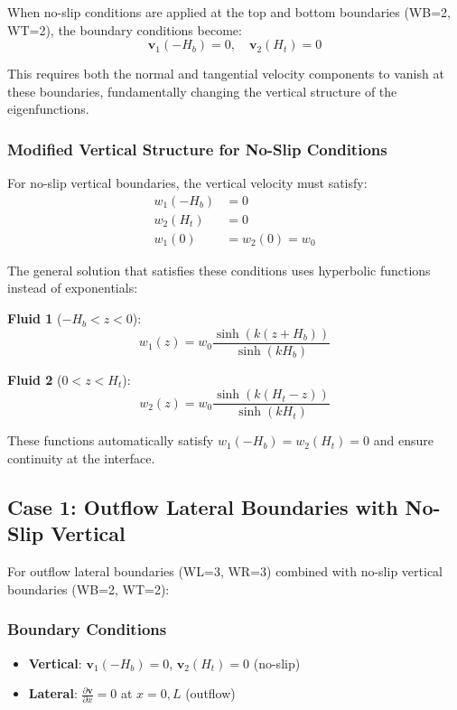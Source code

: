 \documentclass[12pt,a4paper]{article}
\begin{document}
When no-slip conditions are applied at the top and bottom boundaries (WB=2, WT=2), the boundary conditions become:
\begin{equation}
\mathbf{v}_1(-H_b) = 0, \quad \mathbf{v}_2(H_t) = 0
\end{equation}

This requires both the normal and tangential velocity components to vanish at these boundaries, fundamentally changing the vertical structure of the eigenfunctions.

\subsubsection{Modified Vertical Structure for No-Slip Conditions}

For no-slip vertical boundaries, the vertical velocity must satisfy:
\begin{align}
w_1(-H_b) &= 0 \\
w_2(H_t) &= 0 \\
w_1(0) &= w_2(0) = w_0
\end{align}

The general solution that satisfies these conditions uses hyperbolic functions instead of exponentials:

\textbf{Fluid 1} ($-H_b < z < 0$):
\begin{equation}
w_1(z) = w_0 \frac{\sinh(k(z + H_b))}{\sinh(kH_b)}
\end{equation}

\textbf{Fluid 2} ($0 < z < H_t$):
\begin{equation}
w_2(z) = w_0 \frac{\sinh(k(H_t - z))}{\sinh(kH_t)}
\end{equation}

These functions automatically satisfy $w_1(-H_b) = w_2(H_t) = 0$ and ensure continuity at the interface.

\subsection{Case 1: Outflow Lateral Boundaries with No-Slip Vertical}

For outflow lateral boundaries (WL=3, WR=3) combined with no-slip vertical boundaries (WB=2, WT=2):

\subsubsection{Boundary Conditions}
\begin{itemize}
    \item \textbf{Vertical}: $\mathbf{v}_1(-H_b) = 0$, $\mathbf{v}_2(H_t) = 0$ (no-slip)
    \item \textbf{Lateral}: $\frac{\partial \mathbf{v}}{\partial x} = 0$ at $x = 0, L$ (outflow)
\end{itemize}
\end{document}
